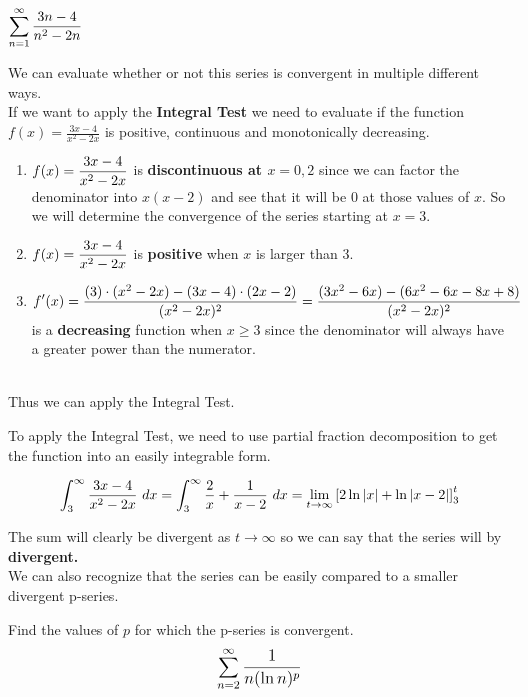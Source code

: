 \documentclass[12pt]{article}
\begin{document}
\begin{solution}
$\mathlarger{\sum_{n=1}^{\infty} \frac{3n - 4}{n^2 - 2n}}$

We can evaluate whether or not this series is convergent in multiple different ways. ~\\

If we want to apply the \textbf{Integral Test} we need to evaluate if the function $f(x) = \frac{3x - 4}{x^2 - 2x}$ is positive, continuous and monotonically decreasing.

\begin{enumerate}[label=$\bullet$]
\item $f(x) = \mathlarger{\frac{3x - 4}{x^2 - 2x}}$ is \textbf{discontinuous at $x = 0, 2$} since we can factor the denominator into $x(x - 2)$ and see that it will be 0 at those values of $x$. So we will determine the convergence of the series starting at $x = 3$. ~\\
\item $f(x) = \mathlarger{\frac{3x - 4}{x^2 - 2x}}$ is \textbf{positive} when $x$ is larger than $3$. ~\\
\item $\mathlarger{f'(x) = \frac{(3) \cdot (x^2 - 2x) - (3x - 4)\cdot (2x - 2)}{(x^2 - 2x)^2} = \frac{(3x^2 - 6x) - (6x^2 - 6x - 8x + 8)}{(x^2 -2x)^2}}$ is a \textbf{decreasing} function when $x \geq 3$ since the denominator will always have a greater power than the numerator.
\end{enumerate}~\\
Thus we can apply the Integral Test.

To apply the Integral Test, we need to use partial fraction decomposition to get the function into an easily integrable form. 

$$\int^{\infty}_3 \frac{3x - 4}{x^2 - 2x} \text{ } dx = \int^{\infty}_3 \frac{2}{x} + \frac{1}{x - 2} \text { } dx\\ = \lim_{t \to \infty} \left[ 2 \ln|x| + \ln|x - 2| \right]^{t}_3$$

The sum will clearly be divergent as $t \to \infty$ so we can say that the series will by \textbf{divergent.} ~\\

We can also recognize that the series can be easily compared to a smaller divergent p-series.





\end{solution}
\pagebreak
Find the values of $p$ for which the p-series is convergent.
$$\mathlarger{\sum_{n=2}^{\infty} \frac{1}{n(\ln n)^p}}$$
\end{document}
